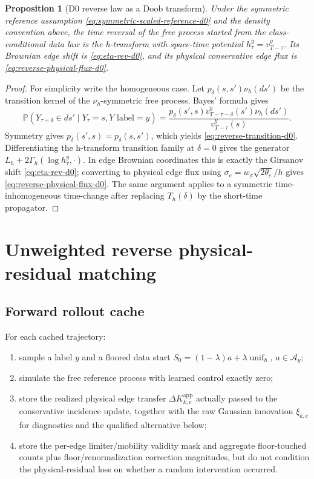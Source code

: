 \documentclass[11pt]{article}
\numberwithin{equation}{section}
\newtheorem{proposition}[theorem]{Proposition}
\newcommand{\Pbb}{\mathbb P}
\newcommand{\unif}{\operatorname{unif}_h}
\newcommand{\1}{\mathbf 1}
\begin{document}
\begin{proposition}[D0 reverse law as a Doob transform]\label{prop:d0-reverse-doob}
Under the symmetric reference assumption \eqref{eq:symmetric-scaled-reference-d0} and the density convention above, the time reversal of the free process started from the class-conditional data law is the h-transform with space-time potential \(h_\tau^y=v_{T-\tau}^y\).  Its Brownian edge shift is \eqref{eq:eta-rev-d0}, and its physical conservative edge flux is \eqref{eq:reverse-physical-flux-d0}.
\end{proposition}

\begin{proof}
For simplicity write the homogeneous case.  Let \(p_\delta(s,s')\nu_h(ds')\) be the transition kernel of the \(\nu_h\)-symmetric free process.  Bayes' formula gives
\[
  \Pbb(Y_{\tau+\delta}\in ds'\mid Y_\tau=s,Y\text{ label}=y)
  =\frac{p_\delta(s',s)v_{T-\tau-\delta}^y(s')\nu_h(ds')}{v_{T-\tau}^y(s)}.
\]
Symmetry gives \(p_\delta(s',s)=p_\delta(s,s')\), which yields \eqref{eq:reverse-transition-d0}.  Differentiating the h-transform transition family at \(\delta=0\) gives the generator \(L_h+2\Gamma_h(\log h_\tau^y,\cdot)\).  In edge Brownian coordinates this is exactly the Girsanov shift \eqref{eq:eta-rev-d0}; converting to physical edge flux using \(\sigma_e=w_\sigma\sqrt{2\theta_e}/h\) gives \eqref{eq:reverse-physical-flux-d0}.  The same argument applies to a symmetric time-inhomogeneous time-change after replacing \(T_h(\delta)\) by the short-time propagator.
\end{proof}

\section{Unweighted reverse physical-residual matching}

\subsection{Forward rollout cache}

For each cached trajectory:
\begin{enumerate}[label=\textup{(C\arabic*)},leftmargin=2.4em]
  \item sample a label \(y\) and a floored data start \(S_0=(1-\lambda)a+\lambda\unif\), \(a\in\mathcal A_y\);
  \item simulate the free reference process with learned control exactly zero;
  \item store the realized physical edge transfer \(\Delta K^{\mathrm{app}}_{k,e}\) actually passed to the conservative incidence update, together with the raw Gaussian innovation \(\xi_{k,e}\) for diagnostics and the qualified alternative below;
  \item store the per-edge limiter/mobility validity mask and aggregate floor-touched counts plus floor/renormalization correction magnitudes, but do not condition the physical-residual loss on whether a random intervention occurred.
\end{enumerate}
\end{document}
